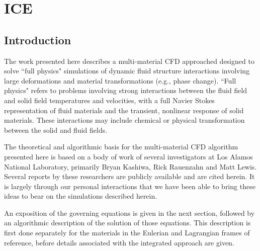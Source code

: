 \newcommand{\SUM}{\raise1.5pt\hbox{$\scriptstyle\sum_{s=1}^N$}}

\section{ICE} \label{Sec:ICE}


\subsection{Introduction}
The work presented here describes a multi-material CFD approached designed
to solve ``full physics" simulations of dynamic fluid structure interactions
involving large deformations and material transformations (e.g., phase change).
``Full physics" refers to problems involving strong interactions between
the fluid field and solid field temperatures and velocities, with a full
Navier Stokes representation of fluid materials and the transient, nonlinear
response of solid materials.  These interactions may include chemical or
physical transformation between the solid and fluid fields.

The theoretical and algorithmic basis for the multi-material CFD algorithm
presented here is based on a body of work of several investigators at Los
Alamos National Laboratory, primarily Bryan Kashiwa, Rick Rauenzahn and Matt
Lewis.  Several reports by these researchers are publicly available and are
cited herein.  It is largely through our personal interactions that we have
been able to bring these ideas to bear on the simulations described herein.


An exposition of the governing equations is given in the next section,
followed by an algorithmic description of the solution of those equations.
This description is first done separately for the materials in the Eulerian
and Lagrangian frames of reference, before details associated with the
integrated approach are given. 

